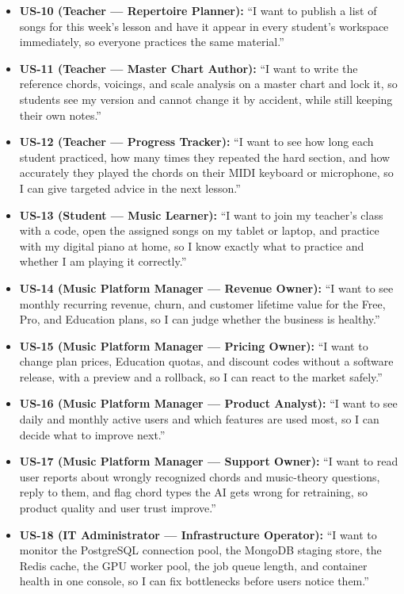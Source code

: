 \documentclass[a4paper]{article}
\begin{document}
\begin{itemize}
    \item \textbf{US-10 (Teacher --- Repertoire Planner):} ``I want to publish a list of songs for this week's lesson and have it appear in every student's workspace immediately, so everyone practices the same material.''
    \item \textbf{US-11 (Teacher --- Master Chart Author):} ``I want to write the reference chords, voicings, and scale analysis on a master chart and lock it, so students see my version and cannot change it by accident, while still keeping their own notes.''
    \item \textbf{US-12 (Teacher --- Progress Tracker):} ``I want to see how long each student practiced, how many times they repeated the hard section, and how accurately they played the chords on their MIDI keyboard or microphone, so I can give targeted advice in the next lesson.''
    \item \textbf{US-13 (Student --- Music Learner):} ``I want to join my teacher's class with a code, open the assigned songs on my tablet or laptop, and practice with my digital piano at home, so I know exactly what to practice and whether I am playing it correctly.''
    \item \textbf{US-14 (Music Platform Manager --- Revenue Owner):} ``I want to see monthly recurring revenue, churn, and customer lifetime value for the Free, Pro, and Education plans, so I can judge whether the business is healthy.''
    \item \textbf{US-15 (Music Platform Manager --- Pricing Owner):} ``I want to change plan prices, Education quotas, and discount codes without a software release, with a preview and a rollback, so I can react to the market safely.''
    \item \textbf{US-16 (Music Platform Manager --- Product Analyst):} ``I want to see daily and monthly active users and which features are used most, so I can decide what to improve next.''
    \item \textbf{US-17 (Music Platform Manager --- Support Owner):} ``I want to read user reports about wrongly recognized chords and music-theory questions, reply to them, and flag chord types the AI gets wrong for retraining, so product quality and user trust improve.''
    \item \textbf{US-18 (IT Administrator --- Infrastructure Operator):} ``I want to monitor the PostgreSQL connection pool, the MongoDB staging store, the Redis cache, the GPU worker pool, the job queue length, and container health in one console, so I can fix bottlenecks before users notice them.''

\end{itemize}
\end{document}
